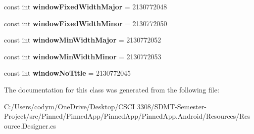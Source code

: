 \begin{DoxyCompactItemize}
const int {\bfseries window\+Fixed\+Width\+Major} = 2130772048
\item 
\mbox{\label{class_pinned_app_1_1_droid_1_1_resource_1_1_attribute_a48246caa2a7e8be63d76a0cb08f22bb6}} 
const int {\bfseries window\+Fixed\+Width\+Minor} = 2130772050
\item 
\mbox{\label{class_pinned_app_1_1_droid_1_1_resource_1_1_attribute_acce1469759b4589d794ce07242e01709}} 
const int {\bfseries window\+Min\+Width\+Major} = 2130772052
\item 
\mbox{\label{class_pinned_app_1_1_droid_1_1_resource_1_1_attribute_a4042d5fd4909ff1a9e7560048d68f58a}} 
const int {\bfseries window\+Min\+Width\+Minor} = 2130772053
\item 
\mbox{\label{class_pinned_app_1_1_droid_1_1_resource_1_1_attribute_a426fcaca41a52ee803b4cd956798654e}} 
const int {\bfseries window\+No\+Title} = 2130772045
\end{DoxyCompactItemize}


The documentation for this class was generated from the following file\+:\begin{DoxyCompactItemize}
\item 
C\+:/\+Users/codym/\+One\+Drive/\+Desktop/\+C\+S\+C\+I 3308/\+S\+D\+M\+T-\/\+Semester-\/\+Project/src/\+Pinned/\+Pinned\+App/\+Pinned\+App/\+Pinned\+App.\+Android/\+Resources/Resource.\+Designer.\+cs\end{DoxyCompactItemize}
